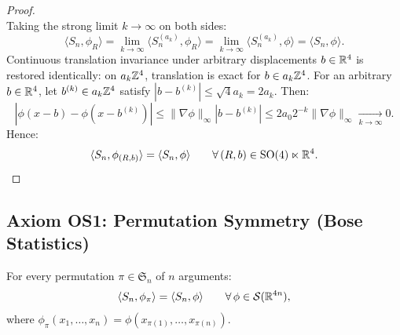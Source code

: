 \begin{proof}
\begin{equation}
\end{equation}
Taking the strong limit $k \to \infty$ on both sides:
\begin{equation}
\langle S_n, \phi_R \rangle = \lim_{k \to \infty} \langle S_n^{(a_k)}, \phi_R \rangle = \lim_{k \to \infty} \langle S_n^{(a_k)}, \phi \rangle = \langle S_n, \phi \rangle.
\end{equation}
Continuous translation invariance under arbitrary displacements $b \in \mathbb{R}^4$ is restored identically: on $a_k \mathbb{Z}^4$, translation is exact for $b \in a_k \mathbb{Z}^4$. For an arbitrary $b \in \mathbb{R}^4$, let $b^{(k)} \in a_k \mathbb{Z}^4$ satisfy $|b - b^{(k)}| \le \sqrt{4} a_k = 2 a_k$. Then:
\begin{equation}
|\phi(x - b) - \phi(x - b^{(k)})| \le \|\nabla \phi\|_\infty |b - b^{(k)}| \le 2 a_0 2^{-k} \|\nabla \phi\|_\infty \xrightarrow[k \to \infty]{} 0.
\end{equation}
Hence:
\begin{equation}
\langle S_n, \phi_{(R, b)} \rangle = \langle S_n, \phi \rangle \qquad \forall \, (R, b) \in \mathrm{SO}(4) \ltimes \mathbb{R}^4. \qedhere
\end{equation}
\end{proof}

\subsection{Axiom OS1: Permutation Symmetry (Bose Statistics)}
\label{subsec:os1}

\begin{proposition}
\label{prop:os1}
For every permutation $\pi \in \mathfrak{S}_n$ of $n$ arguments:
\begin{equation}
\label{eq:os1_permutation_invariance}
\langle S_n, \phi_\pi \rangle = \langle S_n, \phi \rangle \qquad \forall \, \phi \in \mathcal{S}(\mathbb{R}^{4n}),
\end{equation}
where $\phi_\pi(x_1, \dots, x_n) = \phi(x_{\pi(1)}, \dots, x_{\pi(n)})$.
\end{proposition}


